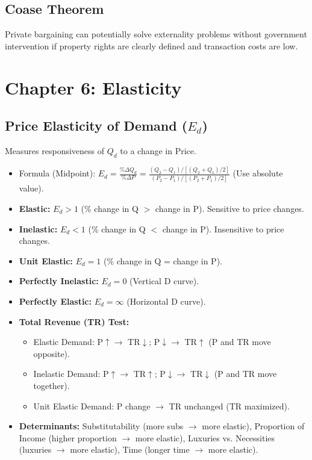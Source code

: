 \documentclass{article}
\begin{document}
\subsection*{Coase Theorem}
Private bargaining can potentially solve externality problems without government intervention if property rights are clearly defined and transaction costs are low.

\section*{Chapter 6: Elasticity}

\subsection*{Price Elasticity of Demand ($E_d$)}
Measures responsiveness of $Q_d$ to a change in Price.
\begin{itemize}
    \item Formula (Midpoint): $E_d = \frac{\text{\%}\Delta Q_d}{\text{\%}\Delta P} = \frac{(Q_2-Q_1)/[(Q_2+Q_1)/2]}{(P_2-P_1)/[(P_2+P_1)/2]}$ (Use absolute value).
    \item \textbf{Elastic:} $E_d > 1$ (\% change in Q $>$ change in P). Sensitive to price changes.
    \item \textbf{Inelastic:} $E_d < 1$ (\% change in Q $<$ change in P). Insensitive to price changes.
    \item \textbf{Unit Elastic:} $E_d = 1$ (\% change in Q = change in P).
    \item \textbf{Perfectly Inelastic:} $E_d = 0$ (Vertical D curve).
    \item \textbf{Perfectly Elastic:} $E_d = \infty$ (Horizontal D curve).
    \item \textbf{Total Revenue (TR) Test:}
        \begin{itemize}
            \item Elastic Demand: P$\uparrow \rightarrow$ TR$\downarrow$; P$\downarrow \rightarrow$ TR$\uparrow$ (P and TR move opposite).
            \item Inelastic Demand: P$\uparrow \rightarrow$ TR$\uparrow$; P$\downarrow \rightarrow$ TR$\downarrow$ (P and TR move together).
            \item Unit Elastic Demand: P change $\rightarrow$ TR unchanged (TR maximized).
        \end{itemize}
    \item \textbf{Determinants:} Substitutability (more subs $\rightarrow$ more elastic), Proportion of Income (higher proportion $\rightarrow$ more elastic), Luxuries vs. Necessities (luxuries $\rightarrow$ more elastic), Time (longer time $\rightarrow$ more elastic).
\end{itemize}
\end{document}
